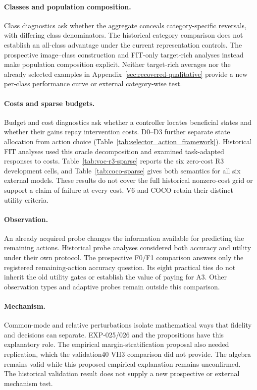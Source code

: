 \paragraph{Classes and population composition.}
Class diagnostics ask whether the aggregate conceals category-specific
reversals, with differing class denominators. The historical category
comparison does not establish an all-class advantage under the current
representation controls.
The prospective image--class construction and FIT-only target-rich analyses
instead make population composition explicit. Neither target-rich averages
nor the already selected examples in Appendix~\ref{sec:recovered-qualitative}
provide a new per-class performance curve or external category-wise test.

\paragraph{Costs and sparse budgets.}
Budget and cost diagnostics ask whether a controller locates beneficial
states and whether their gains repay intervention costs. D0--D3 further
separate state allocation from action choice
(Table~\ref{tab:selector_action_framework}). Historical FIT analyses used
this oracle decomposition and examined task-adapted responses to costs.
Table~\ref{tab:voc-r3-sparse} reports the six zero-cost R3 development
cells, and Table~\ref{tab:coco-sparse} gives both semantics for all six
external models. These results do not cover the full historical nonzero-cost
grid or support a claim of failure at every cost. V6 and COCO retain their
distinct utility criteria.

\paragraph{Observation.}
An already acquired probe changes the information available for predicting
the remaining actions. Historical probe analyses considered both accuracy
and utility under their own protocol. The prospective F0/F1 comparison
answers only the registered remaining-action accuracy question. Its eight
practical ties do not inherit the old utility gates or establish the value
of paying for A3. Other observation types and adaptive probes remain
outside this comparison.

\paragraph{Mechanism.}
Common-mode and relative perturbations isolate mathematical ways that
fidelity and decisions can separate. EXP-025/026 and the propositions have
this explanatory role. The empirical margin-stratification proposal also
needed replication, which the validation40 VH3 comparison did not provide.
The algebra remains valid while this proposed empirical explanation remains
unconfirmed. The historical validation result does not supply a new
prospective or external mechanism test.

